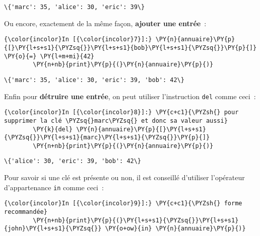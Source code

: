     \begin{Verbatim}[commandchars=\\\{\}]
\{'marc': 35, 'alice': 30, 'eric': 39\}

    \end{Verbatim}

    Ou encore, exactement de la même façon, \textbf{ajouter une entrée}~:

    \begin{Verbatim}[commandchars=\\\{\}]
{\color{incolor}In [{\color{incolor}7}]:} \PY{n}{annuaire}\PY{p}{[}\PY{l+s+s1}{\PYZsq{}}\PY{l+s+s1}{bob}\PY{l+s+s1}{\PYZsq{}}\PY{p}{]} \PY{o}{=} \PY{l+m+mi}{42}
        \PY{n+nb}{print}\PY{p}{(}\PY{n}{annuaire}\PY{p}{)}
\end{Verbatim}


    \begin{Verbatim}[commandchars=\\\{\}]
\{'marc': 35, 'alice': 30, 'eric': 39, 'bob': 42\}

    \end{Verbatim}

    Enfin pour \textbf{détruire une entrée}, on peut utiliser l'instruction
\texttt{del} comme ceci~:

    \begin{Verbatim}[commandchars=\\\{\}]
{\color{incolor}In [{\color{incolor}8}]:} \PY{c+c1}{\PYZsh{} pour supprimer la clé \PYZsq{}marc\PYZsq{} et donc sa valeur aussi}
        \PY{k}{del} \PY{n}{annuaire}\PY{p}{[}\PY{l+s+s1}{\PYZsq{}}\PY{l+s+s1}{marc}\PY{l+s+s1}{\PYZsq{}}\PY{p}{]}
        \PY{n+nb}{print}\PY{p}{(}\PY{n}{annuaire}\PY{p}{)}
\end{Verbatim}


    \begin{Verbatim}[commandchars=\\\{\}]
\{'alice': 30, 'eric': 39, 'bob': 42\}

    \end{Verbatim}

    Pour savoir si une clé est présente ou non, il est conseillé d'utiliser
l'opérateur d'appartenance \texttt{in} comme ceci~:

    \begin{Verbatim}[commandchars=\\\{\}]
{\color{incolor}In [{\color{incolor}9}]:} \PY{c+c1}{\PYZsh{} forme recommandée}
        \PY{n+nb}{print}\PY{p}{(}\PY{l+s+s1}{\PYZsq{}}\PY{l+s+s1}{john}\PY{l+s+s1}{\PYZsq{}} \PY{o+ow}{in} \PY{n}{annuaire}\PY{p}{)}
\end{Verbatim}


